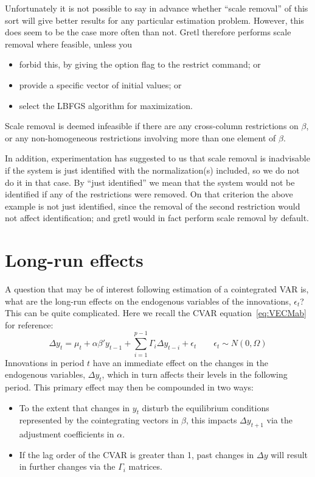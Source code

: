 Unfortunately it is not possible to say in advance whether ``scale
removal'' of this sort will give better results for any particular
estimation problem.  However, this does seem to be the case more often
than not.  Gretl therefore performs scale removal where feasible,
unless you
\begin{itemize}
\item forbid this, by giving the  option
  flag to the restrict command; or
\item provide a specific vector of initial values; or
\item select the LBFGS algorithm for maximization.
\end{itemize}

Scale removal is deemed infeasible if there are any cross-column
restrictions on $\beta$, or any non-homogeneous restrictions involving
more than one element of $\beta$.  

In addition, experimentation has suggested to us that scale removal is
inadvisable if the system is just identified with the normalization(s)
included, so we do not do it in that case.  By ``just identified'' we
mean that the system would not be identified if any of the
restrictions were removed.  On that criterion the above example is not
just identified, since the removal of the second restriction would not
affect identification; and gretl would in fact perform scale removal
by default.

\section{Long-run effects}
\label{sec:vecm-lr}

A question that may be of interest following estimation of a
cointegrated VAR is, what are the long-run effects on the endogenous
variables of the innovations, $\epsilon_t$? This can be quite
complicated. Here we recall the CVAR equation~\ref{eq:VECMab} for
reference:
\[
    \Delta y_t = \mu_t + \alpha \beta' y_{t-1} + \sum_{i=1}^{p-1} \Gamma_i 
    \Delta y_{t-i} + \epsilon_t \qquad \epsilon_t \sim N(0, \Omega)
\]
Innovations in period $t$ have an immediate effect on the changes in
the endogenous variables, $\Delta y_t$, which in turn affects their
levels in the following period. This primary effect may then be
compounded in two ways:
\begin{itemize}
\item To the extent that changes in $y_t$ disturb the equilibrium
  conditions represented by the cointegrating vectors in $\beta$, this
  impacts $\Delta y_{t+1}$ via the adjustment coefficients in
  $\alpha$.
\item If the lag order of the CVAR is greater than 1, past changes in
  $\Delta y$ will result in further changes via the $\Gamma_i$ matrices.
\end{itemize}

